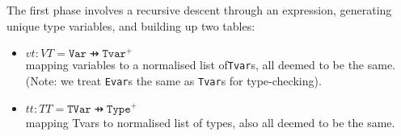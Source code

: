 The first phase involves a recursive descent through an expression,
generating unique type variables, and building up two tables:
\begin{itemize}
  \item $vt : VT = \texttt{Var} \pfun \texttt{Tvar}^+$
   \\ mapping variables to a normalised list of\texttt{Tvar}s,
      all deemed to be the same.
      (Note: we treat \texttt{Evar}s the same as \texttt{Tvar}s for type-checking).
  \item $tt: TT =  \texttt{TVar} \pfun \texttt{Type}^+$
    \\ mapping Tvars to normalised list of types,
     also all deemed to be the same.
\end{itemize}